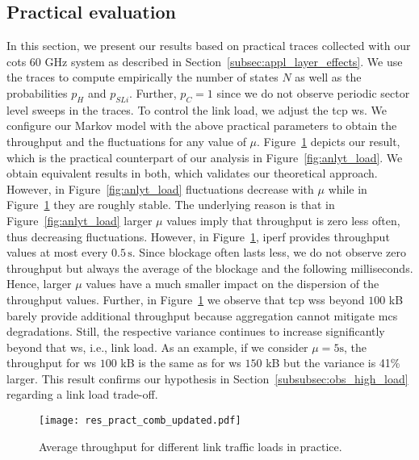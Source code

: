 \documentclass{article}
\begin{document}
\subsection{Practical evaluation}

In this section, we present our results based on practical traces collected with our \ac{cots} 60 GHz system as described in Section~\ref{subsec:appl_layer_effects}. We use the traces to compute empirically the number of states $N$ as well as the probabilities $p_H$ and $p_{SLi}$. Further, $p_C = 1$ since we do not observe periodic sector level sweeps in the traces. To control the link load, we adjust the \ac{tcp} \ac{ws}. We configure our Markov model with the above practical parameters to obtain the throughput and the fluctuations for any value of $\mu$. Figure~\ref{fig:res_pract_comb} depicts our result, which is the practical counterpart of our analysis in Figure~\ref{fig:anlyt_load}. We obtain equivalent results in both, which validates our theoretical approach. However, in Figure~\ref{fig:anlyt_load} fluctuations decrease with $\mu$ while in Figure~\ref{fig:res_pract_comb} they are roughly stable. The underlying reason is that in Figure~\ref{fig:anlyt_load} larger $\mu$ values imply that throughput is zero less often, thus decreasing fluctuations. However, in Figure~\ref{fig:res_pract_comb}, iperf provides throughput values at most every $0.5\,\text{s}$. Since blockage often lasts less, we do not observe zero throughput but always the average of the blockage and the following milliseconds. Hence, larger $\mu$ values have a much smaller impact on the dispersion of the throughput values. Further, in Figure~\ref{fig:res_pract_comb} we observe that \ac{tcp} \acp{ws} beyond $100$ kB barely provide additional throughput because aggregation cannot mitigate \ac{mcs} degradations. Still, the respective variance continues to increase significantly beyond that \ac{ws}, i.e., link load. As an example, if we consider $\mu = 5 \text{s}$, the throughput for \ac{ws} $100$ kB is the same as for \ac{ws} $150$ kB but the variance is 41\% larger. This result confirms our hypothesis in Section~\ref{subsubsec:obs_high_load} regarding a link load trade-off.

\begin{figure}[t]
	\centering
		\texttt{[image: res\_pract\_comb\_updated.pdf]}
	\caption{Average throughput for different link traffic loads in practice.}
	\label{fig:res_pract_comb}
\end{figure}
\end{document}
